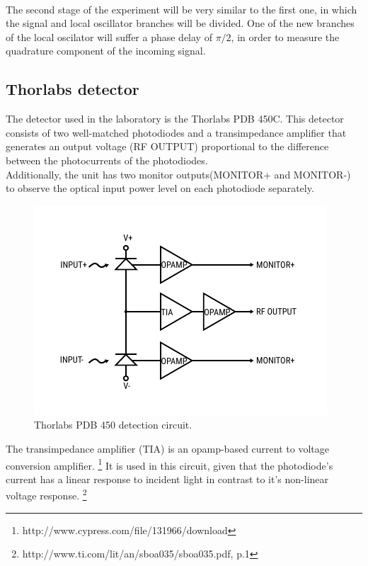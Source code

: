 \begin{bibunit}[plain]
\\
The second stage of the experiment will be very similar to the first one, in which the signal and local oscillator branches will be divided. One of the new branches of the local oscilator will suffer a phase delay of $\pi/2$, in order to measure the quadrature component of the incoming signal.\\
\subsection{Thorlabs detector}
The detector used in the laboratory is the Thorlabs PDB 450C. This detector consists of two well-matched photodiodes and a transimpedance amplifier that generates an output voltage (RF OUTPUT) proportional to the difference between the photocurrents of the photodiodes.\\
Additionally, the unit has two monitor outputs(MONITOR+ and MONITOR-) to observe the optical input power level on each photodiode separately.
\cite{pdb450Cmanual}
%
\begin{figure}[H]
	\centering
	\includegraphics{./sdf/optical_detection/figures/thorlabs-circuit.pdf}
	\caption{Thorlabs PDB 450 detection circuit.}
\end{figure}
%
%
The transimpedance amplifier (TIA) is an opamp-based current to voltage conversion amplifier.
\footnote{http://www.cypress.com/file/131966/download}
It is used in this circuit, given that the photodiode's current has a linear response to incident light in contrast to it's non-linear voltage response.
\footnote{http://www.ti.com/lit/an/sboa035/sboa035.pdf, p.1}
\\


\end{bibunit}
